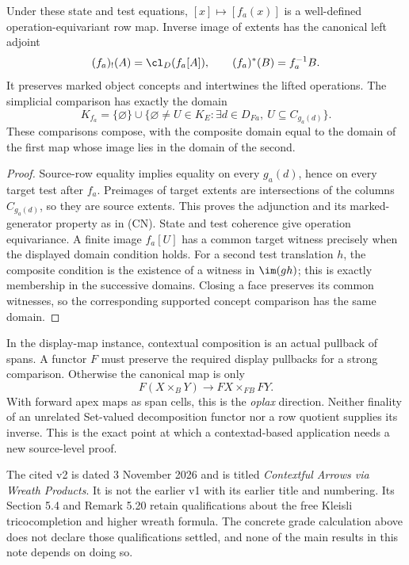\begin{proposition}
Under these state and test equations, $[x]\mapsto[f_a(x)]$ is a
well-defined operation-equivariant row map. Inverse image of extents has
the canonical left adjoint
\[
 (f_a)_!(A)=\cl_D(f_a[A]),\qquad (f_a)^*(B)=f_a^{-1}B.
\]
It preserves marked object concepts and intertwines the lifted operations.
The simplicial comparison has exactly the domain
\[
 K_{f_a}=\{\varnothing\}\cup
 \{\varnothing\ne U\in K_E:\exists d\in D_{Fa},\ U\subseteq C_{g_a(d)}\}.
\]
These comparisons compose, with the composite domain equal to the domain
of the first map whose image lies in the domain of the second.
\end{proposition}
\begin{proof}
Source-row equality implies equality on every $g_a(d)$, hence on every
target test after $f_a$. Preimages of target extents are intersections
of the columns $C_{g_a(d)}$, so they are source extents. This proves the
adjunction and its marked-generator property as in (CN). State and test
coherence give operation equivariance. A finite image $f_a[U]$ has a
common target witness precisely when the displayed domain condition holds.
For a second test translation $h$, the composite condition is the
existence of a witness in $\im(gh)$; this is exactly membership in the
successive domains. Closing a face preserves its common witnesses,
so the corresponding supported concept comparison has the same domain.
\end{proof}

In the display-map instance, contextual composition is an actual pullback
of spans. A functor $F$ must preserve the required display pullbacks for
a strong comparison. Otherwise the canonical map is only
\[
 F(X\times_BY)\longrightarrow FX\times_{FB}FY.
\]
With forward apex maps as span cells, this is the \emph{oplax} direction.
Neither finality of an unrelated Set-valued decomposition functor nor a
row quotient supplies its inverse. This is the exact point at which a
contextad-based application needs a new source-level proof.

The cited v2 is dated 3 November 2026 and is titled \emph{Contextful
Arrows via Wreath Products}. It is not the earlier v1 with its earlier
title and numbering. Its Section 5.4 and Remark 5.20 retain qualifications
about the free Kleisli tricocompletion and higher wreath formula. The
concrete grade calculation above does not declare those qualifications
settled, and none of the main results in this note depends on doing so.
